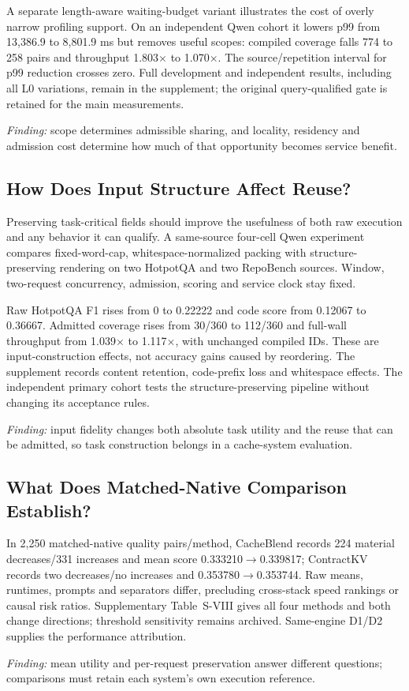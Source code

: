 \label{sec:costvariant}
A separate length-aware waiting-budget variant illustrates the cost of overly narrow profiling support. On an independent Qwen cohort it lowers p99 from 13,386.9 to 8,801.9 ms but removes useful scopes: compiled coverage falls 774 to 258 pairs and throughput 1.803$\times$ to 1.070$\times$. The source/repetition interval for p99 reduction crosses zero. Full development and independent results, including all L0 variations, remain in the supplement; the original query-qualified gate is retained for the main measurements.

\noindent\emph{Finding:} scope determines admissible sharing, and locality, residency and admission cost determine how much of that opportunity becomes service benefit.

\subsection{How Does Input Structure Affect Reuse?}
\label{sec:fidelity}
Preserving task-critical fields should improve the usefulness of both raw execution and any behavior it can qualify. A same-source four-cell Qwen experiment compares fixed-word-cap, whitespace-normalized packing with structure-preserving rendering on two HotpotQA and two RepoBench sources. Window, two-request concurrency, admission, scoring and service clock stay fixed.

Raw HotpotQA F1 rises from 0 to 0.22222 and code score from 0.12067 to 0.36667. Admitted coverage rises from 30/360 to 112/360 and full-wall throughput from 1.039$\times$ to 1.117$\times$, with unchanged compiled IDs. These are input-construction effects, not accuracy gains caused by reordering. The supplement records content retention, code-prefix loss and whitespace effects. The independent primary cohort tests the structure-preserving pipeline without changing its acceptance rules.

\noindent\emph{Finding:} input fidelity changes both absolute task utility and the reuse that can be admitted, so task construction belongs in a cache-system evaluation.

\subsection{What Does Matched-Native Comparison Establish?}
\label{sec:baselines}
In 2,250 matched-native quality pairs/method, CacheBlend records 224 material decreases/331 increases and mean score 0.333210$\rightarrow$0.339817; ContractKV records two decreases/no increases and 0.353780$\rightarrow$0.353744. Raw means, runtimes, prompts and separators differ, precluding cross-stack speed rankings or causal risk ratios. Supplementary Table~S-VIII gives all four methods and both change directions; threshold sensitivity remains archived. Same-engine D1/D2 supplies the performance attribution.

\noindent\emph{Finding:} mean utility and per-request preservation answer different questions; comparisons must retain each system's own execution reference.
